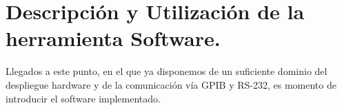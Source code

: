 
\chapter{Descripción y Utilización de la herramienta Software.}

Llegados a este punto, en el que ya disponemos de un suficiente dominio del despliegue hardware y de la comunicación vía GPIB y RS-232, es momento de introducir el software implementado. 

%
%
%
%
%
%
%
%
%
%
